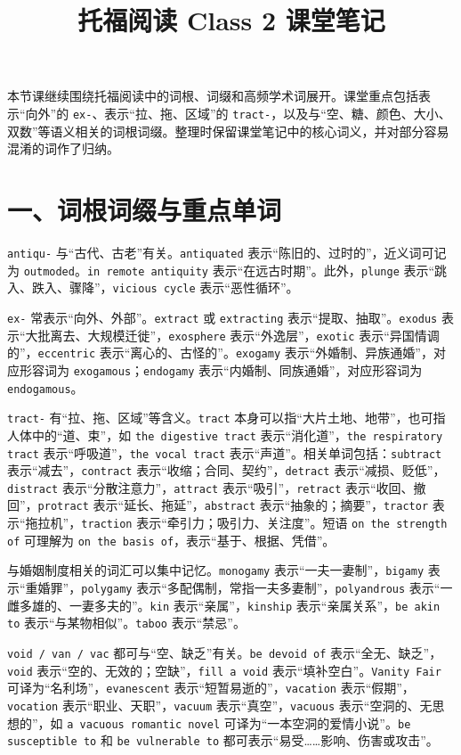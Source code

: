 \documentclass[UTF8,zihao=-4]{ctexart}
\title{\heiti 托福阅读 Class 2 课堂笔记}
\author{}
\date{}
\begin{document}
\maketitle
\thispagestyle{fancy}

本节课继续围绕托福阅读中的词根、词缀和高频学术词展开。课堂重点包括表示“向外”的 \texttt{ex-}、表示“拉、拖、区域”的 \texttt{tract-}，以及与“空、糖、颜色、大小、双数”等语义相关的词根词缀。整理时保留课堂笔记中的核心词义，并对部分容易混淆的词作了归纳。

\section*{一、词根词缀与重点单词}

\texttt{antiqu-} 与“古代、古老”有关。\texttt{antiquated} 表示“陈旧的、过时的”，近义词可记为 \texttt{outmoded}。\texttt{in remote antiquity} 表示“在远古时期”。此外，\texttt{plunge} 表示“跳入、跌入、骤降”，\texttt{vicious cycle} 表示“恶性循环”。

\texttt{ex-} 常表示“向外、外部”。\texttt{extract} 或 \texttt{extracting} 表示“提取、抽取”。\texttt{exodus} 表示“大批离去、大规模迁徙”，\texttt{exosphere} 表示“外逸层”，\texttt{exotic} 表示“异国情调的”，\texttt{eccentric} 表示“离心的、古怪的”。\texttt{exogamy} 表示“外婚制、异族通婚”，对应形容词为 \texttt{exogamous}；\texttt{endogamy} 表示“内婚制、同族通婚”，对应形容词为 \texttt{endogamous}。

\texttt{tract-} 有“拉、拖、区域”等含义。\texttt{tract} 本身可以指“大片土地、地带”，也可指人体中的“道、束”，如 \texttt{the digestive tract} 表示“消化道”，\texttt{the respiratory tract} 表示“呼吸道”，\texttt{the vocal tract} 表示“声道”。相关单词包括：\texttt{subtract} 表示“减去”，\texttt{contract} 表示“收缩；合同、契约”，\texttt{detract} 表示“减损、贬低”，\texttt{distract} 表示“分散注意力”，\texttt{attract} 表示“吸引”，\texttt{retract} 表示“收回、撤回”，\texttt{protract} 表示“延长、拖延”，\texttt{abstract} 表示“抽象的；摘要”，\texttt{tractor} 表示“拖拉机”，\texttt{traction} 表示“牵引力；吸引力、关注度”。短语 \texttt{on the strength of} 可理解为 \texttt{on the basis of}，表示“基于、根据、凭借”。

与婚姻制度相关的词汇可以集中记忆。\texttt{monogamy} 表示“一夫一妻制”，\texttt{bigamy} 表示“重婚罪”，\texttt{polygamy} 表示“多配偶制，常指一夫多妻制”，\texttt{polyandrous} 表示“一雌多雄的、一妻多夫的”。\texttt{kin} 表示“亲属”，\texttt{kinship} 表示“亲属关系”，\texttt{be akin to} 表示“与某物相似”。\texttt{taboo} 表示“禁忌”。

\texttt{void / van / vac} 都可与“空、缺乏”有关。\texttt{be devoid of} 表示“全无、缺乏”，\texttt{void} 表示“空的、无效的；空缺”，\texttt{fill a void} 表示“填补空白”。\texttt{Vanity Fair} 可译为“名利场”，\texttt{evanescent} 表示“短暂易逝的”，\texttt{vacation} 表示“假期”，\texttt{vocation} 表示“职业、天职”，\texttt{vacuum} 表示“真空”，\texttt{vacuous} 表示“空洞的、无思想的”，如 \texttt{a vacuous romantic novel} 可译为“一本空洞的爱情小说”。\texttt{be susceptible to} 和 \texttt{be vulnerable to} 都可表示“易受……影响、伤害或攻击”。
\end{document}
